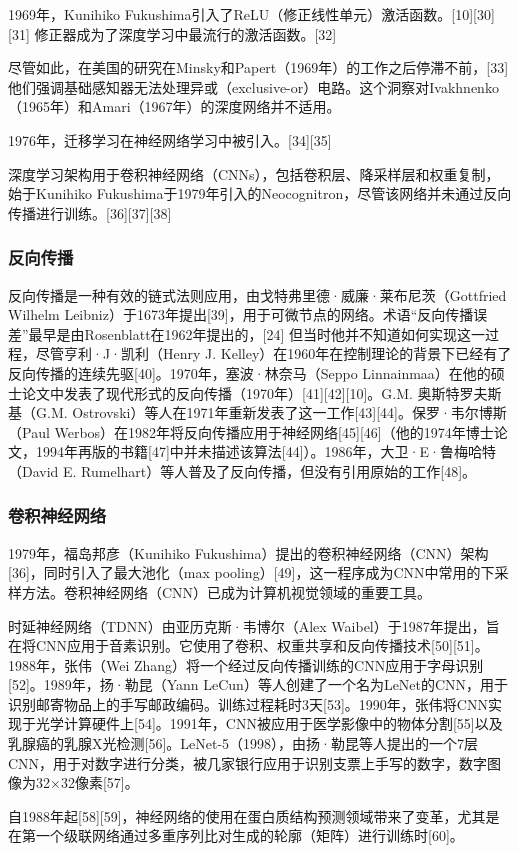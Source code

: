 1969年，Kunihiko Fukushima引入了ReLU（修正线性单元）激活函数。[10][30][31] 修正器成为了深度学习中最流行的激活函数。[32]

尽管如此，在美国的研究在Minsky和Papert（1969年）的工作之后停滞不前，[33] 他们强调基础感知器无法处理异或（exclusive-or）电路。这个洞察对Ivakhnenko（1965年）和Amari（1967年）的深度网络并不适用。

1976年，迁移学习在神经网络学习中被引入。[34][35]

深度学习架构用于卷积神经网络（CNNs），包括卷积层、降采样层和权重复制，始于Kunihiko Fukushima于1979年引入的Neocognitron，尽管该网络并未通过反向传播进行训练。[36][37][38]
\subsubsection{反向传播}
反向传播是一种有效的链式法则应用，由戈特弗里德·威廉·莱布尼茨（Gottfried Wilhelm Leibniz）于1673年提出[39]，用于可微节点的网络。术语“反向传播误差”最早是由Rosenblatt在1962年提出的，[24] 但当时他并不知道如何实现这一过程，尽管亨利·J·凯利（Henry J. Kelley）在1960年在控制理论的背景下已经有了反向传播的连续先驱[40]。1970年，塞波·林奈马（Seppo Linnainmaa）在他的硕士论文中发表了现代形式的反向传播（1970年）[41][42][10]。G.M. 奥斯特罗夫斯基（G.M. Ostrovski）等人在1971年重新发表了这一工作[43][44]。保罗·韦尔博斯（Paul Werbos）在1982年将反向传播应用于神经网络[45][46]（他的1974年博士论文，1994年再版的书籍[47]中并未描述该算法[44]）。1986年，大卫·E·鲁梅哈特（David E. Rumelhart）等人普及了反向传播，但没有引用原始的工作[48]。
\subsubsection{卷积神经网络}
1979年，福岛邦彦（Kunihiko Fukushima）提出的卷积神经网络（CNN）架构[36]，同时引入了最大池化（max pooling）[49]，这一程序成为CNN中常用的下采样方法。卷积神经网络（CNN）已成为计算机视觉领域的重要工具。

时延神经网络（TDNN）由亚历克斯·韦博尔（Alex Waibel）于1987年提出，旨在将CNN应用于音素识别。它使用了卷积、权重共享和反向传播技术[50][51]。1988年，张伟（Wei Zhang）将一个经过反向传播训练的CNN应用于字母识别[52]。1989年，扬·勒昆（Yann LeCun）等人创建了一个名为LeNet的CNN，用于识别邮寄物品上的手写邮政编码。训练过程耗时3天[53]。1990年，张伟将CNN实现于光学计算硬件上[54]。1991年，CNN被应用于医学影像中的物体分割[55]以及乳腺癌的乳腺X光检测[56]。LeNet-5（1998），由扬·勒昆等人提出的一个7层CNN，用于对数字进行分类，被几家银行应用于识别支票上手写的数字，数字图像为32×32像素[57]。

自1988年起[58][59]，神经网络的使用在蛋白质结构预测领域带来了变革，尤其是在第一个级联网络通过多重序列比对生成的轮廓（矩阵）进行训练时[60]。
